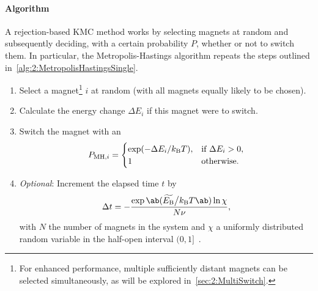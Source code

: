 \paragraph{Algorithm}
A rejection-based KMC method works by selecting magnets at random and subsequently deciding, with a certain probability $P$, whether or not to switch them.
In particular, the Metropolis-Hastings algorithm repeats the steps outlined in~\cref{alg:2:MetropolisHastingsSingle}.
\begin{algorithm}
	\label{alg:2:MetropolisHastingsSingle}
	\begin{enumerate}
		\item Select a magnet\footnote{
			For enhanced performance, multiple sufficiently distant magnets can be selected simultaneously, as will be explored in~\cref{sec:2:MultiSwitch}.
		} $i$ at random (with all magnets equally likely to be chosen).
		\item Calculate the energy change $\Delta E_i$ if this magnet were to switch.
		\item Switch the magnet with an 
		\begin{equation}
			\label{eq:2:MH_acceptance}
			P_{\mathrm{MH},i} = \begin{cases}
				\exp(-\Delta E_i/\kBT), & \text{if } \Delta E_i > 0 \mathrm{,} \\
				1 & \text{otherwise} \mathrm{.}
			\end{cases}
		\end{equation}
		\item \textit{Optional}:
		Increment the elapsed time $t$ by
		\begin{equation}
			\label{eq:Metropolis_time}
			\Delta t = -\frac{\exp\ab(\EBeff\big/\kBT\ab) \ln{\chi}}{N \nu} \mathrm{,}
		\end{equation}
		with $N$ the number of magnets in the system and $\chi$ a uniformly distributed random variable in the half-open interval $(0,1]$~\cite{PhysicalTimeKMC}. %
	\end{enumerate}
\end{algorithm}

